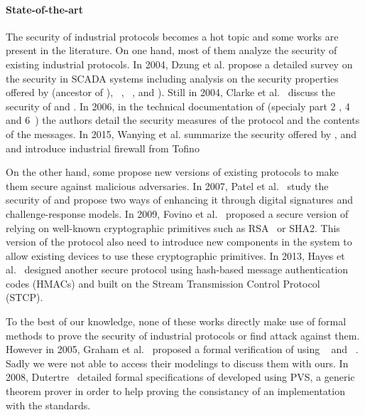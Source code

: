 \paragraph{State-of-the-art}\label{sec:intro_sota}

The security of industrial protocols becomes a hot topic and some works are
present in the literature.
On one hand, most of them analyze the security of existing industrial protocols.
In 2004, Dzung et al. propose a detailed survey on the security in SCADA systems
including analysis on the security properties offered by \opc (ancestor of
\opcua), \mms~\cite{ISO_MMS}, ~\cite{IEC_61850}, \iccp
\cite{IEC_60870} and \etherip).
Still in 2004, Clarke et al.~\cite{CR04} discuss the security of \dnp and
\iccp.
In 2006, in the technical documentation of \opcua (specialy part 2
\cite{opcua_part2}, 4~\cite{opcua_part4} and 6~\cite{opcua_part6}) the authors
detail the security measures of the protocol and the contents of the messages.
In 2015, Wanying et al. summarize the security offered by \modbus, \dnp and \opc
and introduce industrial firewall from Tofino~\cite{TOFINO}

On the other hand, some propose new versions of existing protocols to make them
secure against malicious adversaries.
In 2007, Patel et al.~\cite{PY07} study the security of \dnp and propose two
ways of enhancing it through digital signatures and challenge-response models.
In 2009, Fovino et al.~\cite{FCMT09} proposed a secure version of \modbus
relying on well-known cryptographic primitives such as RSA~\cite{RSA78} or SHA2.
This version of the protocol also need to introduce new components in the system
to allow existing devices to use these cryptographic primitives.
In 2013, Hayes et al.~\cite{HE13} designed another secure \modbus protocol using
hash-based message authentication codes (HMACs) and built on the Stream
Transmission Control Protocol~\cite{Ste07} (STCP).

To the best of our knowledge, none of these works directly make use of formal
methods to prove the security of industrial protocols or find attack against
them.
However in 2005, Graham et al.~\cite{GP05} proposed a formal verification of
\dnp using \ofmc~\cite{BMV03} and \spear~\cite{SH01}.
\TODO Sadly we were not able to access their modelings to discuss them with
ours.
In 2008, Dutertre~\cite{Dut08} detailed formal specifications of \modbus
developed using PVS, a generic theorem prover in order to help proving the
consistancy of an implementation with the standards.
